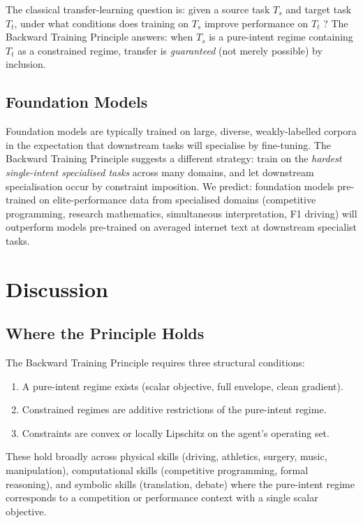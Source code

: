 \documentclass[11pt,twocolumn,a4paper]{article}
\begin{document}
The classical transfer-learning question is: given a source task $T_s$ and target task $T_t$, under what conditions does training on $T_s$ improve performance on $T_t$ \cite{yosinski2014transferable,pan2010survey,weiss2016survey}? The Backward Training Principle answers: when $T_s$ is a pure-intent regime containing $T_t$ as a constrained regime, transfer is \emph{guaranteed} (not merely possible) by inclusion.

\subsection{Foundation Models}

Foundation models \cite{bommasani2021opportunities,kaplan2020scaling,hoffmann2022training} are typically trained on large, diverse, weakly-labelled corpora in the expectation that downstream tasks will specialise by fine-tuning. The Backward Training Principle suggests a different strategy: train on the \emph{hardest single-intent specialised tasks} across many domains, and let downstream specialisation occur by constraint imposition. We predict: foundation models pre-trained on elite-performance data from specialised domains (competitive programming, research mathematics, simultaneous interpretation, F1 driving) will outperform models pre-trained on averaged internet text at downstream specialist tasks.


\section{Discussion}
\label{sec:discussion}

\subsection{Where the Principle Holds}

The Backward Training Principle requires three structural conditions:

\begin{enumerate}[leftmargin=*,itemsep=1pt]
\item A pure-intent regime exists (scalar objective, full envelope, clean gradient).
\item Constrained regimes are additive restrictions of the pure-intent regime.
\item Constraints are convex or locally Lipschitz on the agent's operating set.
\end{enumerate}

These hold broadly across physical skills (driving, athletics, surgery, music, manipulation), computational skills (competitive programming, formal reasoning), and symbolic skills (translation, debate) where the pure-intent regime corresponds to a competition or performance context with a single scalar objective.
\end{document}
